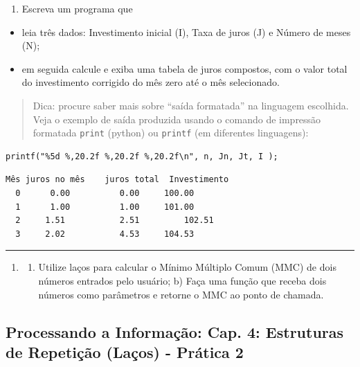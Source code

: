 \documentclass[12pt,a4paper]{article}
\providecommand{\tightlist}{%
      \setlength{\itemsep}{0pt}\setlength{\parskip}{0pt}}
\begin{document}
\begin{enumerate}
\def\labelenumi{\arabic{enumi}.}
\setcounter{enumi}{3}
\tightlist
\item
  Escreva um programa que
\end{enumerate}

\begin{itemize}
\tightlist
\item
  leia três dados: Investimento inicial (I), Taxa de juros (J) e Número
  de meses (N);
\item
  em seguida calcule e exiba uma tabela de juros compostos, com o valor
  total do investimento corrigido do mês zero até o mês selecionado.
\end{itemize}

\begin{quote}
Dica: procure saber mais sobre ``saída formatada'' na linguagem
escolhida. Veja o exemplo de saída produzida usando o comando de
impressão formatada \texttt{print} (python) ou \texttt{printf} (em
diferentes linguagens):
\end{quote}

    \begin{verbatim}
printf("%5d %,20.2f %,20.2f %,20.2f\n", n, Jn, Jt, I );
\end{verbatim}

    \begin{verbatim}
Mês juros no mês    juros total  Investimento
  0      0.00          0.00     100.00
  1      1.00          1.00     101.00
  2     1.51           2.51         102.51
  3     2.02           4.53     104.53
\end{verbatim}

    \begin{center}\rule{0.5\linewidth}{0.5pt}\end{center}

\begin{enumerate}
\def\labelenumi{\arabic{enumi}.}
\setcounter{enumi}{4}
\item
  \begin{enumerate}
  \def\labelenumii{\alph{enumii})}
  \tightlist
  \item
    Utilize laços para calcular o Mínimo Múltiplo Comum (MMC) de dois
    números entrados pelo usuário; b) Faça uma função que receba dois
    números como parâmetros e retorne o MMC ao ponto de chamada.
  \end{enumerate}
\end{enumerate}

    \hypertarget{processando-a-informauxe7uxe3o-cap.-4-estruturas-de-repetiuxe7uxe3o-lauxe7os---pruxe1tica-2}{%
\subsection{Processando a Informação: Cap. 4: Estruturas de Repetição
(Laços) - Prática
2}\label{processando-a-informauxe7uxe3o-cap.-4-estruturas-de-repetiuxe7uxe3o-lauxe7os---pruxe1tica-2}}
\end{document}

